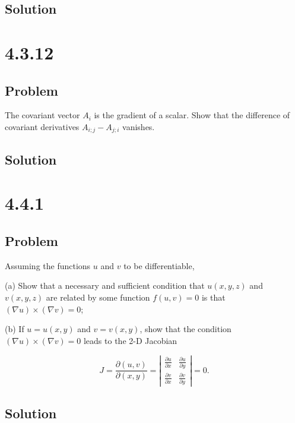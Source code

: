 \documentclass[12pt]{article}
\begin{document}
\subsection{Solution}

\newpage
\section{4.3.12}

\subsection{Problem}

The covariant vector \(A_i\) is the gradient of a scalar. Show that the difference of covariant
derivatives \(A_{i;j} - A_{j;i}\) vanishes.

\subsection{Solution}

\newpage
\section{4.4.1}

\subsection{Problem}

Assuming the functions \(u\) and \(v\) to be differentiable,

(a) Show that a necessary and sufficient condition that \(u(x, y, z)\) and \(v(x, y, z)\) are related by some function \(f(u, v)=0\) is that \((\nabla u) \times(\nabla v)=0\);

(b) If \(u=u(x, y)\) and \(v=v(x, y)\), show that the condition \((\nabla u) \times(\nabla v)=0\) leads to the 2-D Jacobian

\[
J=\frac{\partial(u, v)}{\partial(x, y)}=\left|\begin{array}{ll}
\frac{\partial u}{\partial x} & \frac{\partial u}{\partial y} \\
\frac{\partial v}{\partial x} & \frac{\partial v}{\partial y}
\end{array}\right|=0 .
\]

\subsection{Solution}
\end{document}

